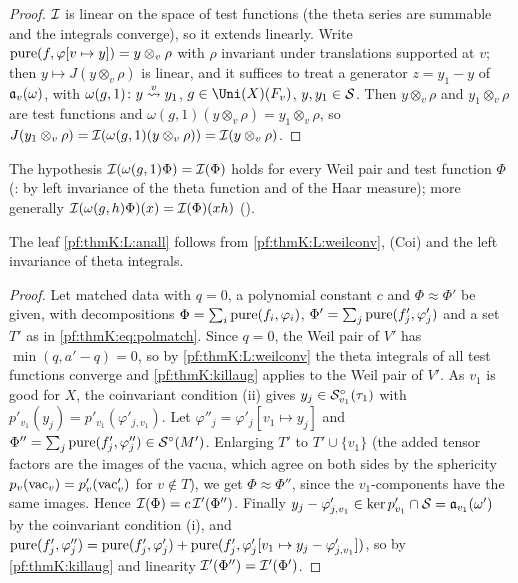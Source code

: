 \begin{proof}
$\mathcal{I}$ is linear on the space of test functions (the theta series are summable and the integrals converge), so it extends
linearly. Write $\operatorname{pure}(f,\varphi[v\mapsto y])=y\otimes_v\rho$ with $\rho$ invariant under translations supported at $v$;
then $y\mapsto J(y\otimes_v\rho)$ is linear, and it suffices to treat a generator $z=y_1-y$ of $\mathfrak{a}_v(\omega)$, with
$\omega(g,1)\colon y\mathrel{\stackrel{v}{\leadsto}}y_1$, $g\in\Uni(X)(F_v)$, $y,y_1\in\mathcal{S}$. Then $y\otimes_v\rho$ and $y_1\otimes_v\rho$ are
test functions and $\omega(g,1)(y\otimes_v\rho)=y_1\otimes_v\rho$, so $J(y_1\otimes_v\rho)=\mathcal{I}(\omega(g,1)(y\otimes_v
\rho))=\mathcal{I}(y\otimes_v\rho)$.
\end{proof}

The hypothesis $\mathcal{I}(\omega(g,1)\Phi)=\mathcal{I}(\Phi)$ holds for every Weil pair and test function $\Phi$
(: by left invariance of the theta function and of the Haar measure); more generally
$\mathcal{I}(\omega(g,h)\Phi)(x)=\mathcal{I}(\Phi)(xh)$ ().

\begin{proposition}\label{pf:thmK:anall}
The leaf \ref{pf:thmK:L:anall} follows from \ref{pf:thmK:L:weilconv}, \textup{(Coi)} and the left invariance of theta
integrals.
\end{proposition}

\begin{proof}
Let matched data with $q=0$, a polynomial constant $c$ and $\Phi\approx\Phi'$ be given, with decompositions
$\Phi=\sum_i\operatorname{pure}(f_i,\varphi_i)$, $\Phi'=\sum_j\operatorname{pure}(f'_j,\varphi'_j)$ and a set $T'$ as in
\eqref{pf:thmK:eq:polmatch}. Since $q=0$, the Weil pair of $V'$ has $\min(q,a'-q)=0$, so by \ref{pf:thmK:L:weilconv} the theta
integrals of all test functions converge and \cref{pf:thmK:killaug} applies to the Weil pair of $V'$. As $v_1$ is good for
$X$, the coinvariant condition (ii) gives $y_j\in\mathcal{S}^{\circ}_{v_1}(\tau_1)$ with $p'_{v_1}(y_j)=p'_{v_1}(\varphi'_{j,v_1})$. Let
$\varphi''_j=\varphi'_j[v_1\mapsto y_j]$ and $\Phi''=\sum_j\operatorname{pure}(f'_j,\varphi''_j)\in\mathcal{S}^{\circ}(M')$. Enlarging $T'$ to
$T'\cup\{v_1\}$ (the added tensor factors are the images of the vacua, which agree on both sides by the sphericity
$p_v(\mathrm{vac}_v)=p'_v(\mathrm{vac}'_v)$ for $v\notin T$), we get $\Phi\approx\Phi''$, since the $v_1$-components have the same
images. Hence $\mathcal{I}(\Phi)=c\,\mathcal{I}'(\Phi'')$. Finally $y_j-\varphi'_{j,v_1}\in\ker p'_{v_1}\cap\mathcal{S}=\mathfrak{a}_{v_1}(\omega')$
by the coinvariant condition (i), and $\operatorname{pure}(f'_j,\varphi''_j)=\operatorname{pure}(f'_j,\varphi'_j)+\operatorname{pure}(f'_j,\varphi'_j[v_1
\mapsto y_j-\varphi'_{j,v_1}])$, so by \cref{pf:thmK:killaug} and linearity $\mathcal{I}'(\Phi'')=\mathcal{I}'(\Phi')$.
\end{proof}

